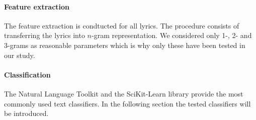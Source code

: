 \documentclass[a4paper,12pt]{article}
\begin{document}
\paragraph{Feature extraction} The feature extraction is condtucted for all lyrics. The procedure consists of transferring the lyrics into $n$-gram representation. We considered only 1-, 2- and 3-grams as reasonable parameters which is why only these have been tested in our study. 

\paragraph{Classification} The Natural Language Toolkit and the SciKit-Learn library provide the most commonly used text classifiers. In the following section the tested classifiers will be introduced. 
\end{document}
